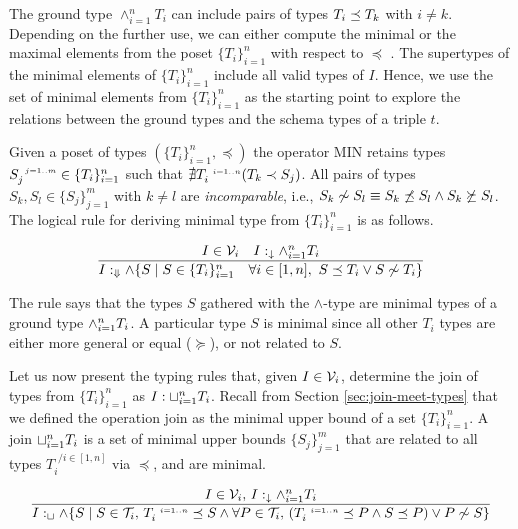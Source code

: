 \documentclass[runningheads]{llncs}
\newcommand{\s}{\scriptscriptstyle\ \,}
\newcommand{\darr}{\downarrow}
\newcommand{\Darr}{\Downarrow}
\newcommand{\V}{{\cal V}}
\newcommand{\T}{{\cal T}}
\newcommand{\memo}[1]{}
\begin{document}
The ground type $\land_{i=1}^nT_i$ can include pairs of types
$T_i\preceq\/T_k$ with $i\not=k$. Depending on the further use, we can
either compute the minimal or the maximal elements from the poset
$\{T_i\}_{i=1}^n$  with respect to $\preceq$
\cite{DaveyPriestley2002}. The supertypes of the minimal elements of
$\{T_i\}_{i=1}^n$ include all valid types of $I$. Hence, we use
the set of minimal elements from $\{T_i\}_{i=1}^n$ as the starting
point to explore the relations between the ground types and the
schema types of a triple $t$.

Given a poset of types $(\{T_i\}_{i=1}^n,\preceq)$ the operator MIN
retains types $S_j^{\s\/j=1..m}\in\{T_i\}_{i=1}^n$ such that
${\nexists}\/T_i^{\s\/i=1..n}(T_k\prec\/S_j)$. All pairs of types
$S_k,S_l\in\{S_j\}_{j=1}^m$ with $k\not=l$ are \emph{incomparable},
i.e.,
$S_k\not\sim\/S_l\equiv\/S_k\not\preceq\/S_l\land\/S_k\not\succeq\/S_l$.
The logical rule for deriving minimal type from $\{T_i\}_{i=1}^n$ is
as follows.

\begin{equation}
\label{rul:min}
\dfrac{I\in\V_i\quad\/I:_\darr\land_{i=1}^n\/T_i}
      {I:_{\Darr}\land \{S \mid S\in\/\{T_i\}_{i=1}^n\quad\forall\/i\in[1,n],\ S\preceq\/T_i\lor\/S\not\sim\/T_i\}}
\end{equation}

The rule says that the types $S$ gathered with the $\land$-type are
minimal types of a ground type $\land_{i=1}^n\/T_i$. A particular type
$S$ is minimal since all other $T_i$ types are either more general or
equal ($\succeq$), or not related to $S$. 


\memo{
\begin{equation}
\label{rul:min-gather}
\dfrac{I\in\V_i\quad\forall\/i=1..m,\ I:_\Darr\/S_i}
      {V:_{\Darr}\land_{j=1}^m\/S_j}
    \end{equation}}
  

Let us now present the typing rules that, given $I\in\V_i$, determine
the join of types from $\{T_i\}_{i=1}^n$ as
$I:\sqcup_{i=1}^n\/T_i$. Recall from Section \ref{sec:join-meet-types}
that we defined the operation join as the minimal upper bound of a set
$\{T_i\}_{i=1}^n$. A join $\sqcup_{i=1}^n\/T_i$ is a set of
minimal upper bounds $\{S_j\}_{j=1}^m$ that are related to all
types $T_i^{\s/i\in[1,n]}$ via $\preceq$, and are minimal.

\begin{equation}
\label{rul:join-logic}
\dfrac{I\in\V_i,\, \/I:_\darr\land_{i=1}^n\/T_i}
      {I:_\sqcup\land\{S \mid \/S\in\T_i,\,\/T_i^{\s\/i=1..n}\preceq\/S\land\forall\/P\in\T_i,\,(T_i^{\s\/i=1..n}\preceq\/P\land\/S\preceq\/P)\lor\/P\not\sim\/S\}}
\end{equation}
\end{document}
